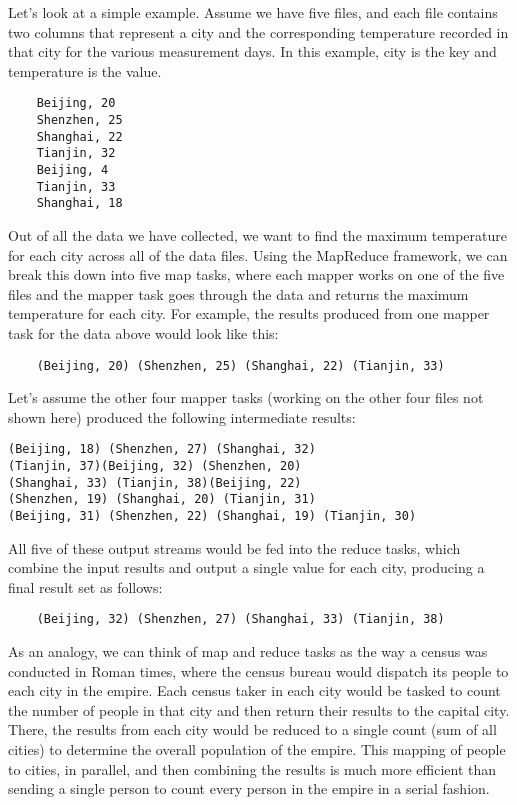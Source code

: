 \documentclass{article} %
\begin{document}
	Let’s look at a simple example. Assume we have five files, and each file contains two columns that represent a city and the corresponding temperature recorded in that city for the various measurement days. In this example, city is the key and temperature is the value.
\begin{verbatim}
	Beijing, 20
	Shenzhen, 25
	Shanghai, 22
	Tianjin, 32
	Beijing, 4
	Tianjin, 33
	Shanghai, 18
\end{verbatim}
	Out of all the data we have collected, we want to find the maximum temperature for each city across all of the data files. Using the MapReduce framework, we can break this down into five map tasks, where each mapper works on one of the five files and the mapper task goes through the data and returns the maximum temperature for each city. For example, the results produced from one mapper task for the data above would look like this:
\begin{verbatim}
	(Beijing, 20) (Shenzhen, 25) (Shanghai, 22) (Tianjin, 33)
\end{verbatim}
Let’s assume the other four mapper tasks (working on the other four files not shown here) produced the following intermediate results:
\begin{verbatim}
(Beijing, 18) (Shenzhen, 27) (Shanghai, 32) 
(Tianjin, 37)(Beijing, 32) (Shenzhen, 20)
(Shanghai, 33) (Tianjin, 38)(Beijing, 22)
(Shenzhen, 19) (Shanghai, 20) (Tianjin, 31)
(Beijing, 31) (Shenzhen, 22) (Shanghai, 19) (Tianjin, 30)
\end{verbatim}
	All five of these output streams would be fed into the reduce tasks, which combine the input results and output a single value for each city, producing a final result set as follows:
\begin{verbatim}
	(Beijing, 32) (Shenzhen, 27) (Shanghai, 33) (Tianjin, 38)
\end{verbatim}
	As an analogy, we can think of map and reduce tasks as the way a census was conducted in Roman times, where the census bureau would dispatch its people to each city in the empire. Each census taker in each city would be tasked to count the number of people in that city and then return their results to the capital city. There, the results from each city would be reduced to a single count (sum of all cities) to determine the overall population of the empire. This mapping of people to cities, in parallel, and then combining the results  is much more efficient than sending a single person to count every person in the empire in a serial fashion.
\end{document}
